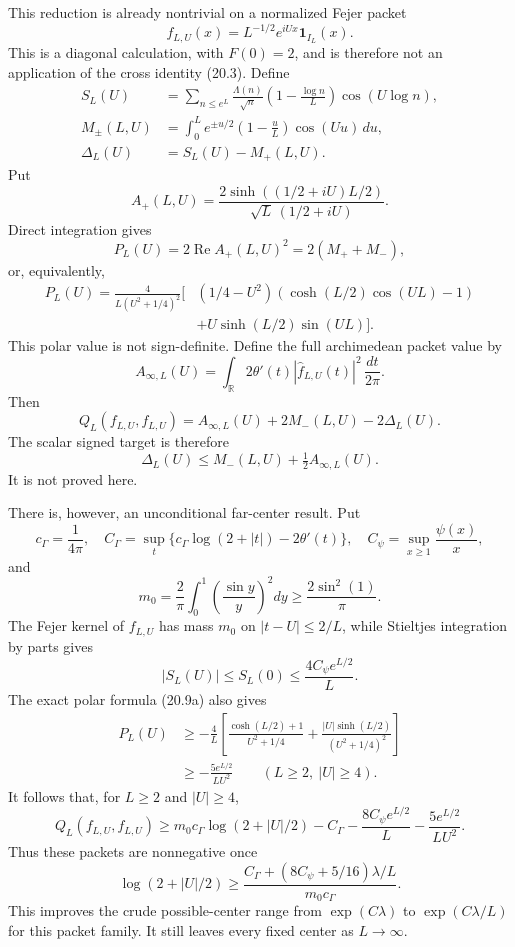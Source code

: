 \documentclass[11pt]{amsart}
\theoremstyle{definition}
\theoremstyle{remark}
\begin{document}
This reduction is already nontrivial on a normalized Fejer packet
\[
 f_{L,U}(x)=L^{-1/2}e^{iUx}\mathbf1_{I_L}(x).
\]
This is a diagonal calculation, with \(F(0)=2\), and is therefore not an
application of the cross identity (20.3).
Define
\[
\begin{aligned}
 S_L(U)&=\sum_{n\le e^L}\frac{\Lambda(n)}{\sqrt n}
 \left(1-\frac{\log n}{L}\right)\cos(U\log n),\\
 M_\pm(L,U)&=\int_0^Le^{\pm u/2}
 \left(1-\frac uL\right)\cos(Uu)\,du,\\
 \Delta_L(U)&=S_L(U)-M_+(L,U).
\end{aligned}
\tag{20.8}
\]
Put
\[
 A_+(L,U)=
 \frac{2\sinh((1/2+iU)L/2)}
 {\sqrt L\,(1/2+iU)}.
\]
Direct integration gives
\[
 P_L(U)
 =
 2\operatorname{Re}A_+(L,U)^2
 =2(M_++M_-),
\tag{20.9}
\]
or, equivalently,
\[
\begin{aligned}
 P_L(U)
 =\frac{4}{L(U^2+1/4)^2}\Big[
 &(1/4-U^2)(\cosh(L/2)\cos(UL)-1)\\
 &+U\sinh(L/2)\sin(UL)
 \Big].
\end{aligned}
\tag{20.9a}
\]
This polar value is not sign-definite.  Define the full archimedean packet
value by
\[
 A_{\infty,L}(U)
 =
 \int_{\mathbb R}2\theta'(t)
 |\widehat f_{L,U}(t)|^2\,\frac{dt}{2\pi}.
\tag{20.9b}
\]
Then
\[
\boxed{
 Q_L(f_{L,U},f_{L,U})
 =
 A_{\infty,L}(U)+2M_-(L,U)-2\Delta_L(U).}
\tag{20.10}
\]
The scalar signed target is therefore
\[
 \Delta_L(U)
 \le M_-(L,U)+\tfrac12A_{\infty,L}(U).
\tag{20.11}
\]
It is not proved here.

There is, however, an unconditional far-center result.  Put
\[
 c_\Gamma=\frac1{4\pi},
 \quad
 C_\Gamma=
 \sup_t\{c_\Gamma\log(2+|t|)-2\theta'(t)\},
 \quad
 C_\psi=\sup_{x\ge1}\frac{\psi(x)}x,
\]
and
\[
 m_0=\frac2\pi\int_0^1\left(\frac{\sin y}{y}\right)^2dy
 \ge\frac{2\sin^2(1)}{\pi}.
\]
The Fejer kernel of \(f_{L,U}\) has mass \(m_0\) on
\(|t-U|\le2/L\), while Stieltjes integration by parts gives
\[
 |S_L(U)|\le S_L(0)\le\frac{4C_\psi e^{L/2}}L.
\]
The exact polar formula (20.9a) also gives
\[
\begin{aligned}
 P_L(U)
 &\ge-\frac4L\left[
 \frac{\cosh(L/2)+1}{U^2+1/4}
 +\frac{|U|\sinh(L/2)}{(U^2+1/4)^2}
 \right]\\
 &\ge-\frac{5e^{L/2}}{LU^2}
 \qquad(L\ge2,\ |U|\ge4).
\end{aligned}
\]
It follows that, for \(L\ge2\) and \(|U|\ge4\),
\[
\boxed{
 Q_L(f_{L,U},f_{L,U})
 \ge
 m_0c_\Gamma\log(2+|U|/2)-C_\Gamma
 -\frac{8C_\psi e^{L/2}}L
 -\frac{5e^{L/2}}{LU^2}.}
\tag{20.12}
\]
Thus these packets are nonnegative once
\[
 \log(2+|U|/2)
 \ge
 \frac{C_\Gamma+(8C_\psi+5/16)\lambda/L}{m_0c_\Gamma}.
\tag{20.13}
\]
This improves the crude possible-center range from
\(\exp(C\lambda)\) to \(\exp(C\lambda/L)\) for this packet family.
It still leaves every fixed center as \(L\to\infty\).
\end{document}
